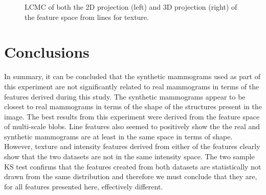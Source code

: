 \begin{figure}[H]
	\centering
	\caption{LCMC of both the 2D projection (left) and 3D projection (right) of the feature space from lines for texture.}\label{fig:LCMC_texture}
\end{figure}
\clearpage


\section{Conclusions}
In summary, it can be concluded that the synthetic mammograms used as part of this experiment are not significantly related to real mammograms in terms of the features derived during this study. The synthetic mammograms appear to be closest to real mammograms in terms of the shape of the structures present in the image. The best results from this experiment were derived from the feature space of multi-scale blobs. Line features also seemed to positively show the the real and synthetic mammograms are at least in the same space in terms of shape. However, texture and intensity features derived from either of the features clearly show that the two datasets are not in the same intensity space. The two sample KS test confirms that the features created from both datasets are statistically not drawn from the same distribution and therefore we must conclude that they are, for all features presented here, effectively different.

